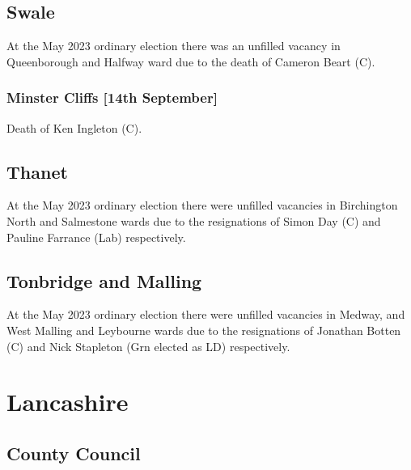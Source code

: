 \documentclass[a4paper,openany]{book}
\begin{document}
\begin{resultsiii}
\subsection*{Swale}

At the May 2023 ordinary election there was an unfilled vacancy in Queenborough and Halfway ward due to the death of Cameron Beart (C).%

\subsubsection*{Minster Cliffs \hspace*{\fill}\nolinebreak[1]%
	\enspace\hspace*{\fill}
	[14th September]}


Death of Ken Ingleton (C).

\subsection*{Thanet}

At the May 2023 ordinary election there were unfilled vacancies in Birchington North and Salmestone wards due to the resignations of Simon Day (C) and Pauline Farrance (Lab) respectively.%
%
%

\subsection*{Tonbridge and Malling}

At the May 2023 ordinary election there were unfilled vacancies in Medway, and West Malling and Leybourne wards due to the resignations of Jonathan Botten (C) and Nick Stapleton (Grn elected as LD) respectively.%
%

\section{Lancashire}

\subsection*{County Council}


\end{resultsiii}
\end{document}
